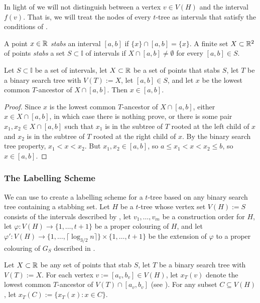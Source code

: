\documentclass[kpfonts]{patmorin}
\let\le\leqslant
\begin{document}
In light of  we will not distinguish between a vertex $v\in V(H)$ and the interval $f(v)$.  That is, we will treat the nodes of every $t$-tree as intervals that satisfy the conditions of .

A point $x\in\mathbb{R}$ \emph{stabs} an interval $[a,b]$ if $\{x\}\cap [a,b]=\{x\}$. A finite set $X\subset\mathbb{R}^2$ of points \emph{stabs} a set $S\subset\mathbb{I}$ of intervals if $X\cap [a,b]\neq\emptyset$ for every $[a,b]\in S$.

\begin{lem}
  Let $S\subset\mathbb{I}$ be a set of intervals, let $X\subset\mathbb{R}$ be a set of points that stabs $S$, let $T$ be a binary search tree with $V(T):=X$, let $[a,b]\in S$, and let $x$ be the lowest common $T$-ancestor of $X\cap [a,b]$.  Then $x\in [a,b]$.
\end{lem}

\begin{proof}
  Since $x$ is the lowest common $T$-ancestor of $X\cap[a,b]$, either $x\in X\cap[a,b]$, in which case there is nothing prove, or there is some pair $x_1,x_2\in X\cap[a,b]$ such that $x_1$ is in the subtree of $T$ rooted at the left child of $x$ and $x_2$ is in the subtree of $T$ rooted at the right child of $x$.  By the binary search tree property, $x_1<x<x_2$. But $x_1,x_2 \in [a,b]$, so $a\le x_1<x<x_2\le b$, so $x\in [a,b]$.  
\end{proof}

\subsubsection{The Labelling Scheme}

We can use  to create a labelling scheme for a $t$-tree based on any binary search tree containing a stabbing set.  Let $H$ be a $t$-tree whose vertex set $V(H):=S$ consists of the intervals described by , let $v_1,\ldots,v_m$ be a construction order for $H$, let $\varphi:V(H)\to\{1,\ldots,t+1\}$ be a proper colouring of $H$, and let $\varphi':V(H)\to\{1,\ldots,\lceil\log_{3/2} n\rceil\}\times\{1,\ldots,t+1\}$ be the extension of $\varphi$ to a proper colouring of $G_S$ described in .

Let $X\subset\mathbb{R}$ be any set of points that stab $S$, let $T$ be a binary search tree with $V(T):=X$.
For each vertex $v:=[a_v,b_v]\in V(H)$, let $x_T(v)$ denote the lowest common $T$-ancestor of $V(T)\cap [a_v,b_v]$ (see ).  For any subset $C\subseteq V(H)$, let $x_T(C):=\{x_T(x):x\in C\}$.  
\end{document}
